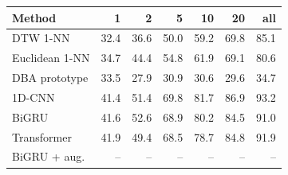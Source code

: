 \begin{tabular}{lrrrrrr}
\toprule
Method & 1 & 2 & 5 & 10 & 20 & all \\
\midrule
DTW 1-NN & 32.4 & 36.6 & 50.0 & 59.2 & 69.8 & 85.1 \\
Euclidean 1-NN & 34.7 & 44.4 & 54.8 & 61.9 & 69.1 & 80.6 \\
DBA prototype & 33.5 & 27.9 & 30.9 & 30.6 & 29.6 & 34.7 \\
1D-CNN & 41.4 & 51.4 & 69.8 & 81.7 & 86.9 & 93.2 \\
BiGRU & 41.6 & 52.6 & 68.9 & 80.2 & 84.5 & 91.0 \\
Transformer & 41.9 & 49.4 & 68.5 & 78.7 & 84.8 & 91.9 \\
BiGRU + aug. & -- & -- & -- & -- & -- & -- \\
\bottomrule
\end{tabular}
